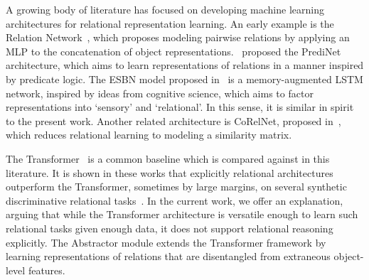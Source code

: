 
% 

A growing body of literature has focused on developing machine learning architectures for relational representation learning. An early example is the Relation Network~\citep{santoro1}, which proposes modeling pairwise relations by applying an MLP to the concatenation of object representations.~\citep{shanahanExplicitlyRelationalNeural} proposed the PrediNet architecture, which aims to learn representations of relations in a manner inspired by predicate logic. The ESBN model proposed in~\citep{esbn} is a memory-augmented LSTM network, inspired by ideas from cognitive science, which aims to factor representations into `sensory' and `relational'. In this sense, it is similar in spirit to the present work. Another related architecture is CoRelNet, proposed in~\citep{kerg2022neural}, which reduces relational learning to modeling a similarity matrix.

The Transformer~\citep{vaswani2017attention} is a common baseline which is compared against in this literature. It is shown in these works that explicitly relational architectures outperform the Transformer, sometimes by large margins, on several synthetic discriminative relational tasks~\citep{shanahanExplicitlyRelationalNeural,esbn,kerg2022neural}. In the current work, we offer an explanation, arguing that while the Transformer architecture is versatile enough to learn such relational tasks given enough data, it does not support relational reasoning explicitly. The Abstractor module extends the Transformer framework by learning representations of relations that are disentangled from extraneous object-level features.

